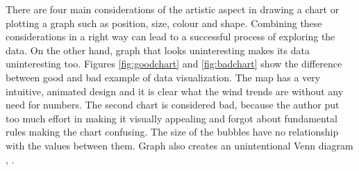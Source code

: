 \documentclass{article}
\begin{document}
{\large
There are four main considerations of the artistic aspect in drawing a chart or plotting a graph such as position, size, colour and shape. Combining these considerations in a right way can lead to a successful process of exploring the data. On the other hand, graph that looks uninteresting makes its data uninteresting too. Figures \ref{fig:goodchart} and \ref{fig:badchart} show the difference between good and bad example of data visualization. The map has a very intuitive, animated design and it is clear what the wind trends are without any need for numbers. The second chart is considered bad, because the author put too much effort in making it visually appealing and forgot about fundamental rules making the chart confusing. The size of the bubbles have no relationship with the values between them. Graph also creates an unintentional Venn diagram \parencite{goodchart}, \parencite{badchart}.\par
}
\end{document}
